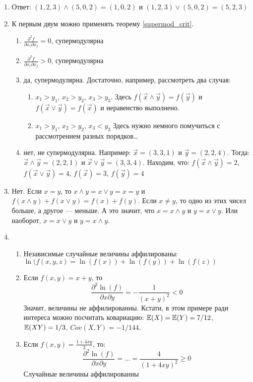 \begin{enumerate}
\item Ответ: $ (1,2,3)\wedge (5,0,2)=(1,0,2) $ и $ (1,2,3)\vee (5,0,2)=(5,2,3) $

\item К первым двум можно применять теорему \ref{supermod_crit}.
\begin{enumerate}
\item $ \frac{\partial^{2} f}{\partial x_{i}\partial x_{j}}=0 $, супермодулярна
\item $ \frac{\partial^{2} f}{\partial x_{i}\partial x_{j}}>0 $, супермодулярна
\item да, супермодулярна. Достаточно, например, рассмотреть два случая:
\begin{enumerate}
\item $ x_{1}>y_{1} $, $ x_{2}>y_{2} $, $x_{3}>y_{3}$. Здесь $ f(\vec{x}\wedge \vec{y})=f(\vec{y}) $ и $ f(\vec{x}\vee \vec{y})=f(\vec{x}) $ и неравенство выполнено.
\item $ x_{1}>y_{1} $, $ x_{2}>y_{2} $, $x_{3}<y_{3}$ Здесь нужно немного помучиться с рассмотрением разных порядков\ldots
\end{enumerate}
\item нет, не супермодулярна. Например: $ \vec{x}=(3,3,1) $ и $ \vec{y}=(2,2,4) $. Тогда: $ \vec{x}\wedge \vec{y}=(2,2,1) $ и $ \vec{x}\vee\vec{y}=(3,3,4) $. Находим, что: $ f(\vec{x}\wedge \vec{y})=2 $, $ f(\vec{x}\vee \vec{y})=4 $, $ f(\vec{x})=3 $, $ f(\vec{y})=4 $

\end{enumerate}

\item Нет. Если $ x=y $, то $ x\wedge y=x\vee y=x=y $  и $ f(x\wedge y)+f(x\vee y)= f(x)+f(y) $. Если $ x\neq y $, то одно из этих чисел больше, а другое — меньше. А это значит, что $ x=x\wedge y $ и $ y=x \vee y $. Или наоборот, $ x=x\vee y $ и $ y=x\wedge y $.

\item
\begin{enumerate}
\item Независимые случайные величины аффилированы: $ \ln(f(x,y,z)=\ln(f(x))+\ln(f(y))+\ln(f(z)) $
\item Если $ f(x,y)=x+y $, то
\begin{equation}
\frac{\partial^{2} \ln(f)}{\partial x \partial y}=-\frac{1}{(x+y)^{2}}<0
\end{equation}
Значит, величины не аффилированны. Кстати, в этом примере ради интереса можно посчитать ковариацию: $ \operatorname{\mathbb{E}}(X)=\operatorname{\mathbb{E}}(Y)=7/12 $, $ \operatorname{\mathbb{E}}(XY)=1/3 $, $ Cov(X,Y)=-1/144 $.
\item Если  $ f(x,y)=\frac{1+4xy}{2} $, то:
\begin{equation}
\frac{\partial^{2} \ln(f)}{\partial x \partial y}=\ldots=\frac{4}{(1+4xy)^{2}}\geq 0
\end{equation}
Случайные величины аффилированны


\end{enumerate}
\end{enumerate}
